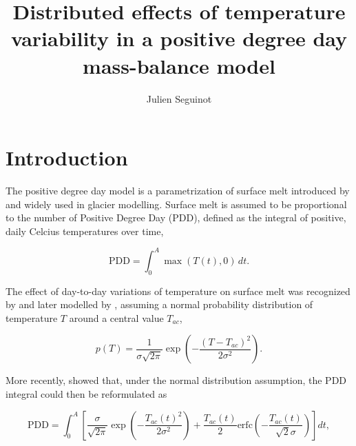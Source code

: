\documentclass[twocolumn]{igs}
\begin{document}
\title[Temperature variability in a positive degree day model]{Distributed effects of temperature variability in a positive degree day mass-balance model}
\author[J. Seguinot]{Julien Seguinot}

\maketitle


\section{Introduction}

The positive degree day model is a parametrization of surface melt introduced by \citet{braithwaite-1984} and widely used in glacier modelling. Surface melt is assumed to be proportional to the number of Positive Degree Day (PDD), defined as the integral of positive, daily Celcius temperatures over time,

\begin{equation} \label{eq:pdd}
  \mathrm{PDD} = \int_{0}^{A}\max(T(t),0)\,dt.
\end{equation}

The effect of day-to-day variations of temperature on surface melt was recognized by \citet{braithwaite-1984} and later modelled by \citet{reeh-1991}, assuming a normal probability distribution of temperature $T$ around a central value $T_{ac}$,

\begin{equation} \label{eq:normal}
  p(T) = \frac{1}{\sigma\sqrt{2\pi}}
    \exp\left({-\frac{(T-T_{ac})^2}{2\sigma^2}}\right).
\end{equation}

More recently, \citet{calov-greve-2005} showed that, under the normal distribution assumption, the PDD integral could then be reformulated as

\begin{equation} \label{eq:calovgreve}
  \mathrm{PDD} = \int_{0}^{A} \left[
    \frac{\sigma}{\sqrt{2\pi}}
    \exp\left({-\frac{T_{ac}(t)^2}{2\sigma^2}}\right)
    +\frac{T_{ac}(t)}{2}
    \mathrm{erfc} \left(-\frac{T_{ac}(t)}{\sqrt{2}\sigma}\right)
  \right]dt,
\end{equation}
\end{document}
